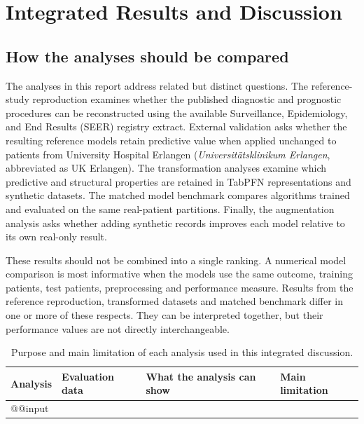 \section{Integrated Results and Discussion}
\label{sec:discussion}

\subsection{How the analyses should be compared}

The analyses in this report address related but distinct questions.  The
reference-study reproduction examines whether the published diagnostic and
prognostic procedures can be reconstructed using the available Surveillance,
Epidemiology, and End Results (SEER) registry extract.  External validation asks
whether the resulting reference models retain predictive value when applied
unchanged to patients from University Hospital Erlangen
(\emph{Universit{\"a}tsklinikum Erlangen}, abbreviated as UK Erlangen).  The
transformation analyses examine which predictive and structural properties are
retained in TabPFN representations and synthetic datasets.  The matched model
benchmark compares algorithms trained and evaluated on the same real-patient
partitions.  Finally, the augmentation analysis asks whether adding synthetic
records improves each model relative to its own real-only result.

These results should not be combined into a single ranking.  A numerical model
comparison is most informative when the models use the same outcome, training
patients, test patients, preprocessing and performance measure.  Results from
the reference reproduction, transformed datasets and matched benchmark differ
in one or more of these respects.  They can be interpreted together, but their
performance values are not directly interchangeable.

\begin{table}[htbp]
\centering\scriptsize
\setlength{\tabcolsep}{3pt}
\caption{Purpose and main limitation of each analysis used in this integrated
discussion.}
\label{tab:discussion:evidence-hierarchy}
\begin{tabularx}{\linewidth}{@{}>{\RaggedRight\arraybackslash}p{2.55cm}>{\RaggedRight\arraybackslash}p{3.0cm}>{\RaggedRight\arraybackslash}p{3.35cm}Y@{}}
\toprule
Analysis & Evaluation data & What the analysis can show & Main limitation \\
\midrule
\csname @@input
\bottomrule
\end{tabularx}
\end{table}

